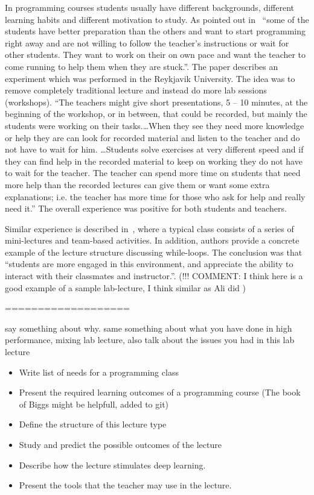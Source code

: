 \documentclass{article}
\begin{document}
In programming courses students usually have different backgrounds,
different learning habits and different motivation to study. As
pointed out in~\cite{experiment_iceland_2006} ``some of the students
have better preparation than the others and want to start programming
right away and are not willing to follow the teacher’s instructions or
wait for other students. They want to work on their on own pace and
want the teacher to come running to help them when they are stuck.''.
The paper describes an experiment which was performed in the Reykjavik
University. The idea was to remove completely traditional lecture and
instead do more lab sessions (workshops). ``The teachers might give
short presentations, 5 – 10 minutes, at the beginning of the workshop,
or in between, that could be recorded, but mainly the students were
working on their tasks.\ldots When they see they need more knowledge
or help they are can look for recorded material and listen to the
teacher and do not have to wait for him. \ldots Students solve
exercises at very different speed and if they can find help in the
recorded material to keep on working they do not have to wait for the
teacher. The teacher can spend more time on students that need more
help than the recorded lectures can give them or want some extra
explanations; i.e. the teacher has more time for those who ask for
help and really need it.'' The overall experience was positive for
both students and teachers.

Similar experience is described in~\cite{cordes2002active}, where a
typical class consists of a series of mini-lectures and team-based
activities.  In addition, authors provide a concrete example of the
lecture structure discussing while-loops. The conclusion was that
``students are more engaged in this environment, and appreciate the
ability to interact with their classmates and instructor.''.
(!!! COMMENT: I think here is a good example of a sample lab-lecture, I think
similar as Ali did )



===================

say something about why.
same something about what you have done in high performance, mixing lab lecture,
also talk about the issues you had in this lab lecture
\begin{itemize}
	\item Write list of needs for a programming class
	\item Present the required learning outcomes of a programming
          course (The book of Biggs might be helpfull, added to git)
	\item Define the structure of this lecture type
	\item Study and predict the possible outcomes of the lecture
	\item Describe how the lecture stimulates deep learning.
	\item Present the tools that the teacher may use in the lecture.
\end{itemize}
\end{document}
